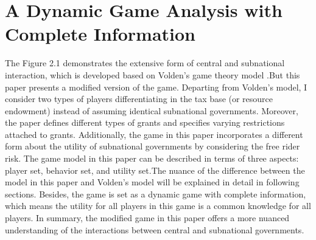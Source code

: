 \section{A Dynamic Game Analysis with Complete Information}
The Figure 2.1 demonstrates the extensive form of central and subnational interaction, which is developed based on Volden's game theory model \cite{volden2007intergovernmental}.But this paper presents a modified version of the game. Departing from Volden's model, I consider two types of players differentiating in the tax base (or resource endowment) instead of assuming identical subnational governments. Moreover, the paper defines different types of grants and specifies varying restrictions attached to grants. Additionally, the game in this paper incorporates a different form about the utility of subnational governments by considering the free rider risk. The game model in this paper can be described in terms of three aspects: player set, behavior set, and utility set.The nuance of the difference between the model in this paper and Volden's model will be explained in detail in following sections. Besides, the game is set as a dynamic game with complete information, which means the utility for all players in this game is a common knowledge for all players. In summary, the modified game in this paper offers a more nuanced understanding of the interactions between central and subnational governments.

